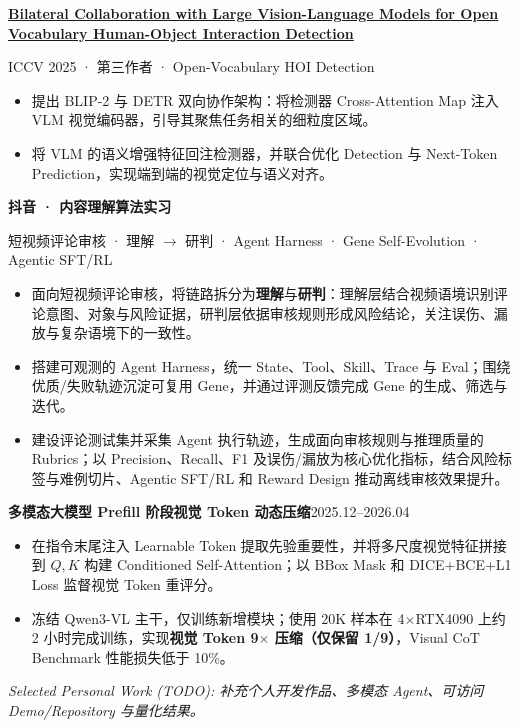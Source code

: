 \documentclass[10pt,a4paper]{article}
\newcommand{\resumeentry}[2]{%
    \noindent\textbf{#1}\par
    {\small\color{muted}#2\par}
}
\newcommand{\datedentry}[2]{%
    \noindent\textbf{#1}\hfill{\small\color{muted}#2}\par
}
\newcommand{\entrygap}{\vspace{0.25em}}
\newcommand{\expgap}{\vspace{0.55em}}
\begin{document}
\expgap
\resumeentry
    {\href{https://arxiv.org/abs/2507.06510}{Bilateral Collaboration with Large Vision-Language Models for Open Vocabulary Human-Object Interaction Detection}}
    {ICCV 2025 · 第三作者 · Open-Vocabulary HOI Detection}
\begin{itemize}
    \item 提出 BLIP-2 与 DETR 双向协作架构：将检测器 Cross-Attention Map 注入 VLM 视觉编码器，引导其聚焦任务相关的细粒度区域。
    \item 将 VLM 的语义增强特征回注检测器，并联合优化 Detection 与 Next-Token Prediction，实现端到端的视觉定位与语义对齐。
\end{itemize}

\expgap
\resumeentry
    {抖音 · 内容理解算法实习}
    {短视频评论审核 · 理解 $\rightarrow$ 研判 · Agent Harness · Gene Self-Evolution · Agentic SFT/RL}
\begin{itemize}
    \item 面向短视频评论审核，将链路拆分为\textbf{理解}与\textbf{研判}：理解层结合视频语境识别评论意图、对象与风险证据，研判层依据审核规则形成风险结论，关注误伤、漏放与复杂语境下的一致性。
    \item 搭建可观测的 Agent Harness，统一 State、Tool、Skill、Trace 与 Eval；围绕优质/失败轨迹沉淀可复用 Gene，并通过评测反馈完成 Gene 的生成、筛选与迭代。
    \item 建设评论测试集并采集 Agent 执行轨迹，生成面向审核规则与推理质量的 Rubrics；以 Precision、Recall、F1 及误伤/漏放为核心优化指标，结合风险标签与难例切片、Agentic SFT/RL 和 Reward Design 推动离线审核效果提升。
\end{itemize}

\expgap
\datedentry{多模态大模型 Prefill 阶段视觉 Token 动态压缩}{2025.12--2026.04}
\begin{itemize}
    \item 在指令末尾注入 Learnable Token 提取先验重要性，并将多尺度视觉特征拼接到 $Q,K$ 构建 Conditioned Self-Attention；以 BBox Mask 和 DICE+BCE+L1 Loss 监督视觉 Token 重评分。
    \item 冻结 Qwen3-VL 主干，仅训练新增模块；使用 20K 样本在 4$\times$RTX4090 上约 2 小时完成训练，实现\textbf{视觉 Token 9$\times$ 压缩（仅保留 1/9）}，Visual CoT Benchmark 性能损失低于 10\%。
\end{itemize}

\entrygap
{\small\color{muted}\textit{Selected Personal Work (TODO): 补充个人开发作品、多模态 Agent、可访问 Demo/Repository 与量化结果。}}
\end{document}
